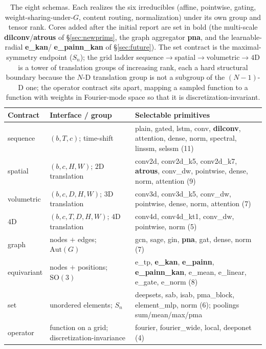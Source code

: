 \documentclass[11pt]{article}
\begin{document}
\begin{table}[h]
\centering
\small
\renewcommand{\arraystretch}{1.2}
\begin{tabular}{p{2.3cm} p{3.1cm} p{7.7cm}}
\toprule
\textbf{Contract} & \textbf{Interface / group} & \textbf{Selectable primitives}\\
\midrule
sequence & $(b,T,c)$; time-shift & plain, gated, lstm, conv, \textbf{dilconv}, attention, dense, norm, spectral, linssm, selssm (11)\\
spatial & $(b,c,H,W)$; $2$D translation & conv2d, conv2d\_k5, conv2d\_k7, \textbf{atrous}, conv\_dw, pointwise, dense, norm, attention (9)\\
volumetric & $(b,c,D,H,W)$; $3$D translation & conv3d, conv3d\_k5, conv\_dw, pointwise, dense, norm, attention (7)\\
$4$D & $(b,c,T,D,H,W)$; $4$D translation & conv4d, conv4d\_kt1, conv\_dw, pointwise, norm (5)\\
graph & nodes $+$ edges; $\mathrm{Aut}(G)$ & gcn, sage, gin, \textbf{pna}, gat, dense, norm (7)\\
equivariant & nodes $+$ positions; $\mathrm{SO}(3)$ & e\_tp, \textbf{e\_kan}, \textbf{e\_painn}, \textbf{e\_painn\_kan}, e\_mean, e\_linear, e\_gate, e\_norm (8)\\
set & unordered elements; $S_n$ & deepsets, sab, isab, pma\_block, element\_mlp, norm (6); poolings sum/mean/max/pma\\
operator & function on a grid; discretization-invariance & fourier, fourier\_wide, local, deeponet (4)\\
\bottomrule
\end{tabular}
\caption{The eight schemas. Each realizes the six irreducibles (affine, pointwise,
gating, weight-sharing-under-$G$, content routing, normalization) under its own group and tensor
rank. Cores added after the initial report are set in bold (the multi-scale \textbf{dilconv}/\textbf{atrous}
of \S\ref{sec:newprims}, the graph aggregator \textbf{pna}, and the learnable-radial \textbf{e\_kan}/%
\textbf{e\_painn\_kan} of \S\ref{sec:future}).
The set contract is the maximal-symmetry endpoint ($S_n$); the grid ladder
sequence$\to$\allowbreak spatial$\to$\allowbreak volumetric$\to$$4$D is a tower of translation groups of increasing rank,
each a hard structural boundary because the $N$-D translation group is not a subgroup of the
$(N{-}1)$-D one; the operator contract sits apart, mapping a sampled function to a function with weights
in Fourier-mode space so that it is discretization-invariant.}
\label{tab:sevencontracts}
\end{table}
\end{document}
